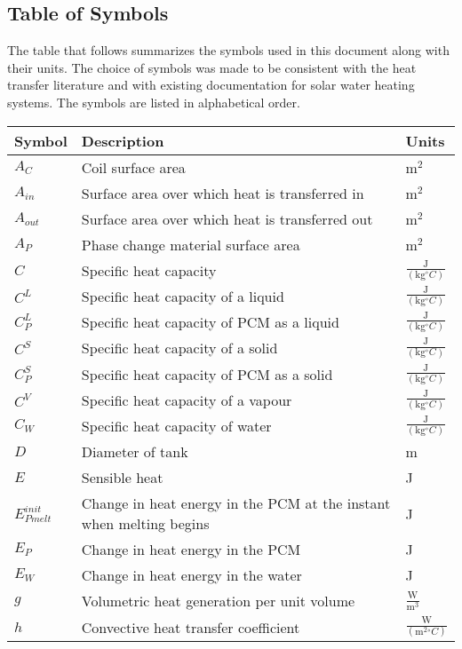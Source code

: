 \documentclass[12pt]{article}
\begin{document}
\subsection{Table of Symbols}
\label{Sec:ToS}
The table that follows summarizes the symbols used in this document along with their units. The choice of symbols was made to be consistent with the heat transfer literature and with existing documentation for solar water heating systems. The symbols are listed in alphabetical order.
\begin{longtable*}{l l l}
\toprule
Symbol & Description & Units
\\
\midrule
$A_{C}$ & Coil surface area & $\text{m}^{2}$
\\
$A_{in}$ & Surface area over which heat is transferred in & $\text{m}^{2}$
\\
$A_{out}$ & Surface area over which heat is transferred out & $\text{m}^{2}$
\\
$A_{P}$ & Phase change material surface area & $\text{m}^{2}$
\\
$C$ & Specific heat capacity & $\frac{\text{J}}{(\text{kg}{}^{\circ}C)}$
\\
$C^{L}$ & Specific heat capacity of a liquid & $\frac{\text{J}}{(\text{kg}{}^{\circ}C)}$
\\
$C_{P}^{L}$ & Specific heat capacity of PCM as a liquid & $\frac{\text{J}}{(\text{kg}{}^{\circ}C)}$
\\
$C^{S}$ & Specific heat capacity of a solid & $\frac{\text{J}}{(\text{kg}{}^{\circ}C)}$
\\
$C_{P}^{S}$ & Specific heat capacity of PCM as a solid & $\frac{\text{J}}{(\text{kg}{}^{\circ}C)}$
\\
$C^{V}$ & Specific heat capacity of a vapour & $\frac{\text{J}}{(\text{kg}{}^{\circ}C)}$
\\
$C_{W}$ & Specific heat capacity of water & $\frac{\text{J}}{(\text{kg}{}^{\circ}C)}$
\\
$D$ & Diameter of tank & m
\\
$E$ & Sensible heat & J
\\
$E_{Pmelt}^{init}$ & Change in heat energy in the PCM at the instant when melting begins & J
\\
$E_{P}$ & Change in heat energy in the PCM & J
\\
$E_{W}$ & Change in heat energy in the water & J
\\
$g$ & Volumetric heat generation per unit volume & $\frac{\text{W}}{\text{m}^{3}}$
\\
$h$ & Convective heat transfer coefficient & $\frac{\text{W}}{(\text{m}^{2}{}^{\circ}C)}$

\end{longtable*}
\end{document}
